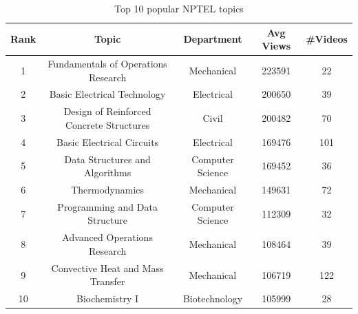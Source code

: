\documentclass{article}
\begin{document}
\begin{table}[!htpb]
    \centering
    \begin{tabular}{|c|c|c|c|c|}
    \hline
        \textbf{Rank} & \textbf{Topic} & \textbf{Department} & \textbf{Avg Views} & 
        \textbf{\#Videos}\\
    \hline
        1 & Fundamentals of Operations Research & Mechanical & 223591 & 22\\
        2 & Basic Electrical Technology & Electrical & 200650 & 39\\
        3 & Design of Reinforced Concrete Structures & Civil & 200482 & 70\\
        4 & Basic Electrical Circuits & Electrical & 169476 & 101\\
        5 & Data Structures and Algorithms & Computer Science & 169452 & 36\\
        6 & Thermodynamics & Mechanical & 149631 & 72\\
        7 & Programming and Data Structure & Computer Science & 112309 & 32\\
        8 & Advanced Operations Research & Mechanical & 108464 & 39\\
        9 & Convective Heat and Mass Transfer & Mechanical & 106719 & 122\\
        10 & Biochemistry I & Biotechnology & 105999 & 28\\
    \hline
    \end{tabular}\vspace{3mm}
    \caption{Top 10 popular NPTEL topics}
    \label{tab:my_label}
\end{table}
\Floatbarrier
\end{document}
